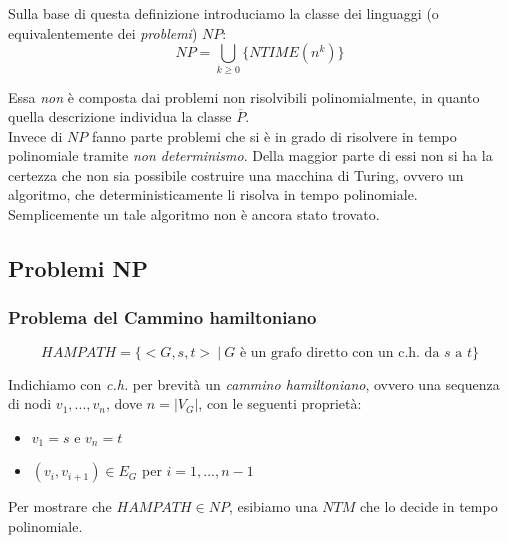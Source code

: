 Sulla base di questa definizione introduciamo la classe dei linguaggi (o equivalentemente dei \textit{problemi}) $NP$:
\[
	NP = \bigcup_{k \geq 0} \{ NTIME(n^k) \}
\]

Essa \textit{non} è composta dai problemi non risolvibili polinomialmente, in quanto quella descrizione individua la classe $\overline{P}$. 
\\
Invece di $NP$ fanno parte problemi che si è in grado di risolvere in tempo polinomiale tramite \textit{non determinismo}. Della maggior parte di essi non si ha la certezza che non sia possibile costruire una macchina di Turing, ovvero un algoritmo, che deterministicamente li risolva in tempo polinomiale. Semplicemente un tale algoritmo non è ancora stato trovato.

\subsection{Problemi NP}

\subsubsection{Problema del Cammino hamiltoniano}

\[
	HAMPATH = \{ <G, s, t> \ | \ G \text{ è un grafo diretto con un c.h. da } s \text{ a } t\}
\]

Indichiamo con \textit{c.h.} per brevità un \textit{cammino hamiltoniano}, ovvero una sequenza di nodi $v_1,...,v_n$, dove $n = |V_G|$, con le seguenti proprietà:
\begin{itemize}
	\item $v_1 = s$ e $v_n = t$
	\item $(v_i, v_{i+1}) \in E_G$ per $i = 1, ..., n-1$
\end{itemize}

Per mostrare che $HAMPATH \in NP$, esibiamo una $NTM$ che lo decide in tempo polinomiale.
\\

